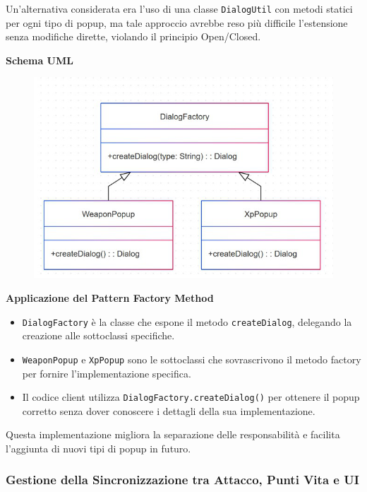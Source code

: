 \documentclass[a4paper,12pt]{report}
\begin{document}
Un’alternativa considerata era l’uso di una classe \texttt{DialogUtil} con metodi statici per ogni tipo di popup, ma tale approccio avrebbe reso più difficile l'estensione senza modifiche dirette, violando il principio Open/Closed.

\textbf{Schema UML}\newline
\begin{figure}[H]
	\includegraphics[scale=0.8]{img/montanariDialog.png}
\end{figure}

\textbf{Applicazione del Pattern Factory Method}\newline
\begin{itemize}
\item \texttt{DialogFactory} è la classe che espone il metodo \texttt{createDialog}, delegando la creazione alle sottoclassi specifiche.
\item \texttt{WeaponPopup} e \texttt{XpPopup} sono le sottoclassi che sovrascrivono il metodo factory per fornire l’implementazione specifica.
\item Il codice client utilizza \texttt{DialogFactory.createDialog()} per ottenere il popup corretto senza dover conoscere i dettagli della sua implementazione.
\end{itemize}

Questa implementazione migliora la separazione delle responsabilità e facilita l’aggiunta di nuovi tipi di popup in futuro.

\subsubsection{Gestione della Sincronizzazione tra Attacco, Punti Vita e UI}
\end{document}
